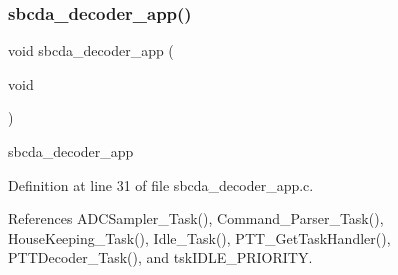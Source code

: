 \subsubsection{\texorpdfstring{sbcda\+\_\+decoder\+\_\+app()}{sbcda\_decoder\_app()}}
{\footnotesize\ttfamily void sbcda\+\_\+decoder\+\_\+app (\begin{DoxyParamCaption}\item[{void}]{ }\end{DoxyParamCaption})}

sbcda\+\_\+decoder\+\_\+app 

Definition at line 31 of file sbcda\+\_\+decoder\+\_\+app.\+c.



References A\+D\+C\+Sampler\+\_\+\+Task(), Command\+\_\+\+Parser\+\_\+\+Task(), House\+Keeping\+\_\+\+Task(), Idle\+\_\+\+Task(), P\+T\+T\+\_\+\+Get\+Task\+Handler(), P\+T\+T\+Decoder\+\_\+\+Task(), and tsk\+I\+D\+L\+E\+\_\+\+P\+R\+I\+O\+R\+I\+TY.

